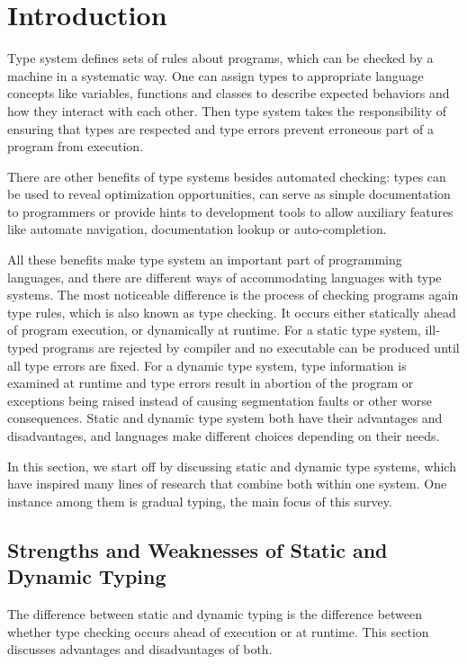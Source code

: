 \section{Introduction}

Type system defines sets of rules about programs, which can be checked by a machine
in a systematic way.
One can assign types to appropriate language concepts like
variables, functions and classes to describe expected behaviors
and how they interact with each other.
Then type system takes the responsibility of ensuring that types are respected and
type errors prevent erroneous part of a program from execution.

There are other benefits of type systems besides automated checking:
types can be used to reveal optimization opportunities,
can serve as simple documentation to programmers or
provide hints to development tools to allow auxiliary features like
automate navigation, documentation lookup
or auto-completion.

All these benefits make type system an important part of programming languages,
and there are different ways of accommodating languages with type systems.
The most noticeable difference is the process of checking programs again type rules,
which is also known as type checking.
It occurs either statically ahead of program execution, or dynamically at runtime.
For a static type system, ill-typed programs are rejected by compiler and
no executable can be produced until all type errors are fixed.
For a dynamic type system,
type information is examined at runtime and type errors result
in abortion of the program or exceptions being raised
instead of causing segmentation faults or other worse consequences.
Static and dynamic type system both have their advantages and disadvantages,
and languages make different choices depending on their needs.

In this section, we start off by discussing static and dynamic type systems,
which have inspired many lines of research that combine both within one system.
One instance among them is gradual typing, the main focus of this survey.

\subsection{Strengths and Weaknesses of Static and Dynamic Typing}

The difference between static and dynamic typing is the difference
between whether type checking occurs ahead of execution or at runtime.
This section discusses advantages and disadvantages of both.


